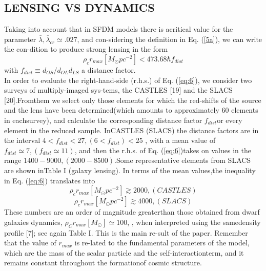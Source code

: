 \documentclass[10pt,a4paper]{article}
\begin{document}
\begin{multicols}{2}
\section{\large\centering LENSING VS DYNAMICS}
Taking into account that in SFDM models there is acritical value for the parameter  \(\bar{\lambda} , \bar{\lambda}_{cr} \simeq .027\), and con-sidering the definition in Eq. (\ref{5a}), we can write the con-dition to produce strong lensing in the form \\
\begin{equation}\label{eq:6}
	\rho_{c} r_{max}[M_{\odot}pc^{-2}]  < 473.68 \hbar f_{dist}
\end{equation}
with \(f_{dist}\equiv d_{OS}/d_{OL}d_{LS}\) a distance factor.\\
\indent
In  order  to  evaluate  the  right-hand-side  (r.h.s.)    of Eq. (\ref{eq:6}), we consider two surveys of multiply-imaged sys-tems,  the  CASTLES  [19]  and  the  SLACS  [20].Fromthem  we  select  only  those  elements  for  which  the  red-shifts  of  the  source  and  the  lens  have  been  determined(which  amounts  to  approximately  60  elements  in  eachsurvey),  and  calculate  the  corresponding  distance  factor $f_{dist}$or  every  element  in  the  reduced  sample.   InCASTLES (SLACS) the distance factors are in the interval  $4<f_{dist}<27, (6<f_{dist})<25$ , with a mean value of $f_{dist}\simeq 7, (f_{dist}\simeq 11)$, and then the r.h.s.  of Eq. (\ref{eq:6})takes on values in the range $1400-9000, (2000-8500)$.Some representative elements from SLACS are shown inTable  I  (galaxy  lensing).   In  terms  of  the  mean  values,the inequality in Eq. (\ref{eq:6}) translates into
 \begin{equation}\label{eq:7a}\tag{7a}
 	\rho_{c}r_{max}[M_{\odot}pc^{-2}] \gtrsim 2000, (CASTLES)
 \end{equation}
  \begin{equation}\tag{7b}
 	\rho_{c}r_{max}[M_{\odot}pc^{-2}] \gtrsim 4000, (SLACS)
 \end{equation} 
\indent
These  numbers  are  an  order  of  magnitude  greaterthan   those   obtained   from   dwarf   galaxies   dynamics, $\rho_{C}r_{max}[M_{\odot}]\simeq 100$, , when interpreted using the samedensity profile [7]; see again Table I. This is the main re-sult of the paper.  Remember that the value of $r_{max}$ is re-lated to the fundamental parameters of the model, which are the mass of the scalar particle and the self-interactionterm, and it remains constant throughout the formationof cosmic structure.\\

\end{multicols}
\end{document}
